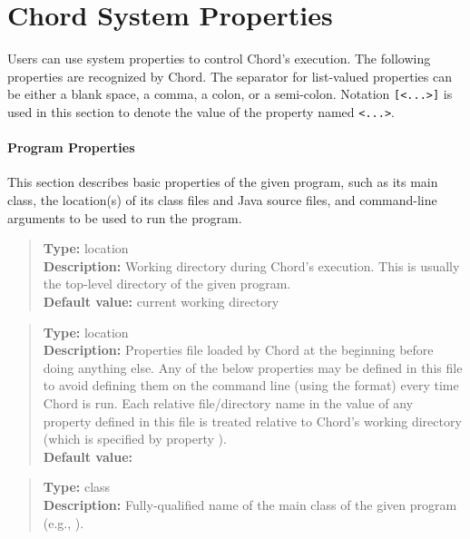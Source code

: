 
\section{Chord System Properties}
\label{sec:chord-sysprops}

Users can use system properties to control Chord's execution.
The following properties are recognized by Chord.
The separator for list-valued properties can be either a blank space, a comma, a colon, or a semi-colon.
Notation {\tt [<...>]} is used in this section to denote the value of the property named {\tt <...>}.

\paragraph{Program Properties} 

This section describes basic properties of the given program, such as
its main class, the location(s) of its class files and Java source
files, and command-line arguments to be used to run the program.

\noindent {}
\begin{quote}
{\bf Type:} location \\
{\bf Description:} Working directory during Chord's execution.  This is
usually the top-level directory of the given program. \\
{\bf Default value:} current working directory
\end{quote}

\noindent {}
\begin{quote}
{\bf Type:} location \\
{\bf Description:} Properties file loaded by Chord at the
beginning before doing anything else.  Any of the below properties may
be defined in this file to avoid defining them on the command line
(using the  format) every time Chord is run.
Each relative file/directory name in the value of any property defined
in this file is treated relative to Chord's working directory (which
is specified by property ). \\
{\bf Default value:} 
\end{quote}

\noindent {}
\begin{quote}
{\bf Type:} class \\
{\bf Description:} Fully-qualified name of the main class of the given program (e.g., ).
\end{quote}

